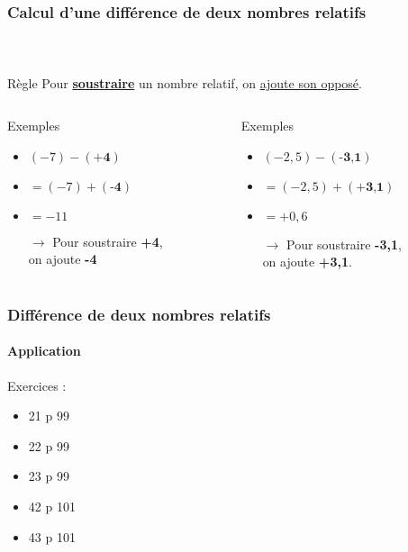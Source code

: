 \documentclass{beamer}
\begin{document}
\begin{frame}
	\frametitle{Calcul d'une différence de deux nombres relatifs}  
	\framesubtitle{\ }	
	
	\begin{block}{Règle}
		Pour \textbf{\underline{soustraire}} un nombre relatif, on \underline{ajoute son opposé}.
	\end{block}
	

		\begin{columns}[onlytextwidth]
			\begin{column}{0.45\textwidth}
				\begin{exampleblock}{Exemples}
					\begin{itemize}
						\item $ (-7) - (\textbf{+4}) $
						\item $= (-7) + (\textbf{-4}) $
						\item $= -11$
						\item[$\rightarrow$] Pour soustraire \textbf{+4},\\  on ajoute \textbf{-4}\pause
					\end{itemize}
				\end{exampleblock}
			\end{column}
			\begin{column}{0.45\textwidth}
				\begin{exampleblock}{Exemples}
					\begin{itemize}
						\item $ (-2,5) - (\textbf{-3,1}) $
						\item $= (-2,5) + (\textbf{+3,1}) $
						\item $= +0,6$
						\item[$\rightarrow$] Pour soustraire \textbf{-3,1},\\  on ajoute \textbf{+3,1}.
					\end{itemize}
				\end{exampleblock}
			\end{column}
		\end{columns}
	
\end{frame}

\begin{frame}
	\frametitle{Différence de deux nombres relatifs}  
	\framesubtitle{Application }	
	
	Exercices :
	\begin{itemize}
		\item 21 p 99
		\item 22 p 99
		\item 23 p 99
		\item 42 p 101
		\item 43 p 101
	\end{itemize}
\end{frame}
\end{document}
